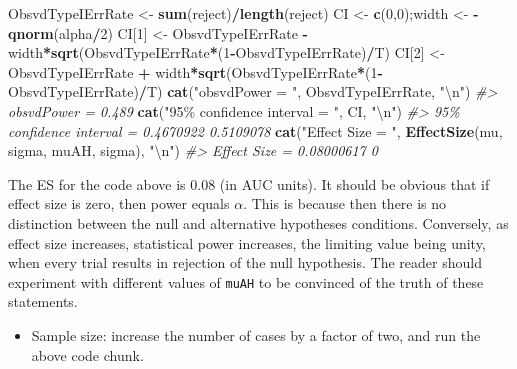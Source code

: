 \documentclass[
]{book}
\newenvironment{Shaded}{\begin{snugshade}}{\end{snugshade}}
\newcommand{\CharTok}[1]{\textcolor[rgb]{0.31,0.60,0.02}{#1}}
\newcommand{\CommentTok}[1]{\textcolor[rgb]{0.56,0.35,0.01}{\textit{#1}}}
\newcommand{\DecValTok}[1]{\textcolor[rgb]{0.00,0.00,0.81}{#1}}
\newcommand{\KeywordTok}[1]{\textcolor[rgb]{0.13,0.29,0.53}{\textbf{#1}}}
\newcommand{\NormalTok}[1]{#1}
\newcommand{\OperatorTok}[1]{\textcolor[rgb]{0.81,0.36,0.00}{\textbf{#1}}}
\newcommand{\StringTok}[1]{\textcolor[rgb]{0.31,0.60,0.02}{#1}}
\providecommand{\tightlist}{%
  \setlength{\itemsep}{0pt}\setlength{\parskip}{0pt}}
\begin{document}
\begin{Shaded}
\begin{Highlighting}[]
\NormalTok{ObsvdTypeIErrRate \textless{}{-}}\StringTok{ }\KeywordTok{sum}\NormalTok{(reject)}\OperatorTok{/}\KeywordTok{length}\NormalTok{(reject)}
\NormalTok{CI \textless{}{-}}\StringTok{ }\KeywordTok{c}\NormalTok{(}\DecValTok{0}\NormalTok{,}\DecValTok{0}\NormalTok{);width \textless{}{-}}\StringTok{ }\OperatorTok{{-}}\KeywordTok{qnorm}\NormalTok{(alpha}\OperatorTok{/}\DecValTok{2}\NormalTok{)}
\NormalTok{CI[}\DecValTok{1}\NormalTok{] \textless{}{-}}\StringTok{ }\NormalTok{ObsvdTypeIErrRate }\OperatorTok{{-}}\StringTok{ }
\StringTok{  }\NormalTok{width}\OperatorTok{*}\KeywordTok{sqrt}\NormalTok{(ObsvdTypeIErrRate}\OperatorTok{*}\NormalTok{(}\DecValTok{1}\OperatorTok{{-}}\NormalTok{ObsvdTypeIErrRate)}\OperatorTok{/}\NormalTok{T)}
\NormalTok{CI[}\DecValTok{2}\NormalTok{] \textless{}{-}}\StringTok{ }\NormalTok{ObsvdTypeIErrRate }\OperatorTok{+}\StringTok{ }
\StringTok{  }\NormalTok{width}\OperatorTok{*}\KeywordTok{sqrt}\NormalTok{(ObsvdTypeIErrRate}\OperatorTok{*}\NormalTok{(}\DecValTok{1}\OperatorTok{{-}}\NormalTok{ObsvdTypeIErrRate)}\OperatorTok{/}\NormalTok{T)}
\KeywordTok{cat}\NormalTok{(}\StringTok{"obsvdPower = "}\NormalTok{, ObsvdTypeIErrRate, }\StringTok{"}\CharTok{\textbackslash{}n}\StringTok{"}\NormalTok{)}
\CommentTok{\#\textgreater{} obsvdPower =  0.489}
\KeywordTok{cat}\NormalTok{(}\StringTok{"95\% confidence interval = "}\NormalTok{, CI, }\StringTok{"}\CharTok{\textbackslash{}n}\StringTok{"}\NormalTok{)}
\CommentTok{\#\textgreater{} 95\% confidence interval =  0.4670922 0.5109078}
\KeywordTok{cat}\NormalTok{(}\StringTok{"Effect Size = "}\NormalTok{, }\KeywordTok{EffectSize}\NormalTok{(mu, sigma, muAH, sigma), }\StringTok{"}\CharTok{\textbackslash{}n}\StringTok{"}\NormalTok{)}
\CommentTok{\#\textgreater{} Effect Size =  0.08000617 0}
\end{Highlighting}
\end{Shaded}

The ES for the code above is 0.08 (in AUC units). It should be obvious that if effect size is zero, then power equals \(\alpha\). This is because then there is no distinction between the null and alternative hypotheses conditions. Conversely, as effect size increases, statistical power increases, the limiting value being unity, when every trial results in rejection of the null hypothesis. The reader should experiment with different values of \texttt{muAH} to be convinced of the truth of these statements.

\begin{itemize}
\tightlist
\item
  Sample size: increase the number of cases by a factor of two, and run the above code chunk.
\end{itemize}
\end{document}
